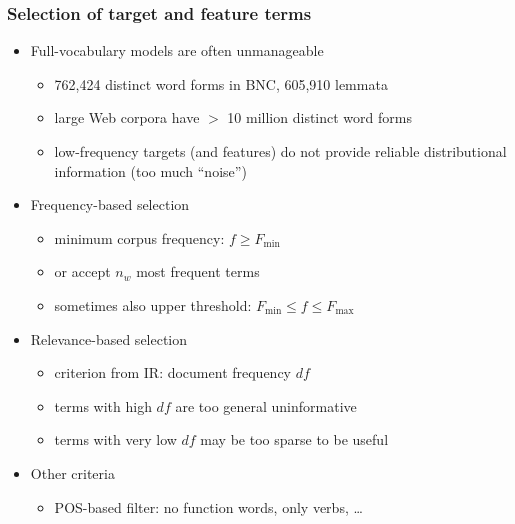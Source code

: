 \documentclass[t]{beamer} %
\begin{document}
\begin{frame}
  \frametitle{Selection of target and feature terms}
  
  \begin{itemize}
  \item Full-vocabulary models are often unmanageable
    \begin{itemize}
    \item 762,424 distinct word forms in BNC, 605,910 lemmata
    \item large Web corpora have $>$ 10 million distinct word forms
    \item low-frequency targets (and features) do not provide reliable distributional information (too much ``noise'')
    \end{itemize}
  \item<2-> Frequency-based selection
    \begin{itemize}
    \item minimum corpus frequency: $f \geq F_{\min}$
    \item or accept $n_w$ most frequent terms
    \item sometimes also upper threshold: $F_{\min}\leq f\leq F_{\max}$
    \end{itemize}
  \item<3-> Relevance-based selection
    \begin{itemize}
    \item criterion from IR: document frequency $df$
    \item terms with high $df$ are too general \so uninformative
    \item terms with very low $df$ may be too sparse to be useful
    \end{itemize}
  \item<4-> Other criteria
    \begin{itemize}
    \item POS-based filter: no function words, only verbs, \ldots
    \end{itemize}
  \end{itemize}
\end{frame}

\end{document}
